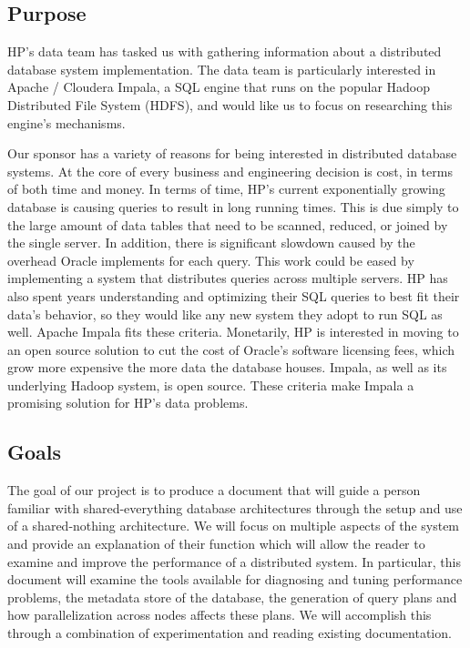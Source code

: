 \documentclass[onecolumn, draftclsnofoot,10pt, compsoc]{IEEEtran}
\begin{document}
\subsection{Purpose}
HP's data team has tasked us with gathering information about a distributed database system implementation. 
The data team is particularly interested in Apache / Cloudera Impala, a SQL engine that runs on the popular Hadoop Distributed File System (HDFS), and would like us to focus on researching this engine's mechanisms. 

Our sponsor has a variety of reasons for being interested in distributed database systems.
At the core of every business and engineering decision is cost, in terms of both time and money.
In terms of time, HP's current exponentially growing database is causing queries to result in long running times.
This is due simply to the large amount of data tables that need to be scanned, reduced, or joined by the single server.
In addition, there is significant slowdown caused by the overhead Oracle implements for each query.
This work could be eased by implementing a system that distributes queries across multiple servers.
HP has also spent years understanding and optimizing their SQL queries to best fit their data's behavior, so they would like any new system they adopt to run SQL as well.
Apache Impala fits these criteria.
Monetarily, HP is interested in moving to an open source solution to cut the cost of Oracle's software licensing fees, which grow more expensive the more data the database houses.
Impala, as well as its underlying Hadoop system, is open source. 
These criteria make Impala a promising solution for HP's data problems.

\subsection{Goals}
The goal of our project is to produce a document that will guide a person familiar with shared-everything database architectures through the setup and use of a shared-nothing architecture.
We will focus on multiple aspects of the system and provide an explanation of their function which will allow the reader to examine and improve the performance of a distributed system.
In particular, this document will examine the tools available for diagnosing and tuning performance problems, the metadata store of the database, the generation of query plans and how parallelization across nodes affects these plans.
We will accomplish this through a combination of experimentation and reading existing documentation.
\end{document}
